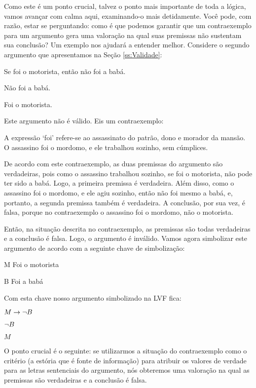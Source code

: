 Como este é um ponto crucial, talvez o ponto mais importante de toda a lógica, vamos avançar com calma aqui, examinando-o mais detidamente.
Você pode, com razão, estar se perguntando:
como é que podemos garantir que um contraexemplo para um argumento gera uma valoração na qual suas premissas não sustentam sua conclusão?
Um exemplo nos ajudará a entender melhor.
Considere o segundo argumento que apresentamos na Seção \ref{ss:Validade}:
\begin{earg}
	\item[] Se foi o motorista, então não foi a babá.
	\item[] Não foi a babá.
	\item[\therefore] Foi o motorista.
\end{earg}
Este argumento não é válido.
Eis um contraexemplo:
\begin{ebullet}
	\item A expressão `foi' refere-se ao assassinato do patrão, dono e morador da mansão.
	O assassino foi o mordomo, e ele trabalhou sozinho, sem cúmplices.
\end{ebullet}

De acordo com este contraexemplo, as duas premissas do argumento são verdadeiras, pois como o assassino trabalhou sozinho, se foi o motorista, não pode ter sido a babá.
Logo, a primeira premissa é verdadeira.
Além disso, como o assassino foi o mordomo, e ele agiu sozinho, então não foi mesmo a babá, e, portanto, a segunda premissa também é verdadeira.
A conclusão, por sua vez, é falsa, porque no contraexemplo o assassino foi o mordomo, não o motorista.

Então, na situação descrita no contraexemplo, as premissas são todas verdadeiras e a conclusão é falsa.
Logo, o argumento é inválido.
Vamos agora simbolizar este argumento de acordo com a seguinte chave de simbolização:
	\begin{ekey}
		\item[M] Foi o motorista
		\item[B] Foi a babá
	\end{ekey}
Com esta chave nosso argumento simbolizado na LVF fica:
\begin{earg}
	\item[] $M \rightarrow \neg B$
	\item[] $\neg B$
	\item[\therefore] $M$
\end{earg}
O ponto crucial é o seguinte:
se utilizarmos a situação do contraexemplo como o critério (a estória que é fonte de informação) para atribuir os valores de verdade para as letras sentenciais do argumento, nós obteremos uma valoração na qual as premissas são verdadeiras e a conclusão é falsa.

